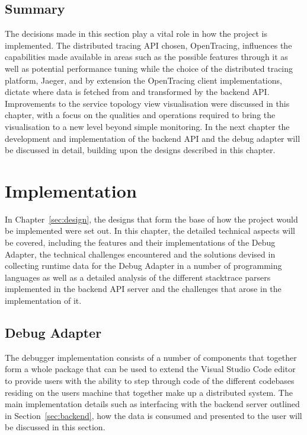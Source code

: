 \documentclass[12pt,pdftex,titlepage]{report}
\begin{document}
        \section{Summary}
            The decisions made in this section play a vital role in how the project is implemented. The distributed tracing API chosen, OpenTracing, influences the capabilities made available in areas such as the possible features 
            through it as well as potential performance tuning while the choice of the distributed tracing platform, Jaeger, and by extension the OpenTracing client implementations, dictate where data is fetched from and transformed
            by the backend API. Improvements to the service topology view visualisation were discussed in this chapter, with a focus on the qualities and operations required to bring the visualisation to a new level beyond simple monitoring.
            In the next chapter the development and implementation of the backend API and the debug adapter will be discussed in detail, building upon the designs described in this chapter.

    \chapter{Implementation}
        In Chapter~\ref{sec:design}, the designs that form the base of how the project would be implemented were set out. In this chapter, the detailed technical aspects will be covered, including the features and their implementations
        of the Debug Adapter, the technical challenges encountered and the solutions devised in collecting runtime data for the Debug Adapter in a number of programming languages as well as a detailed analysis of the different stacktrace 
        parsers implemented in the backend API server and the challenges that arose in the implementation of it.

        \section{Debug Adapter}
        \label{sec:impldebug}
            The debugger implementation consists of a number of components that together form a whole package that can be used to extend the Visual Studio Code editor to provide users with the ability
            to step through code of the different codebases residing on the users machine that together make up a distributed system. The main implementation details such as interfacing with the backend
            server outlined in Section~\ref{sec:backend}, how the data is consumed and presented to the user will be discussed in this section.
\end{document}
